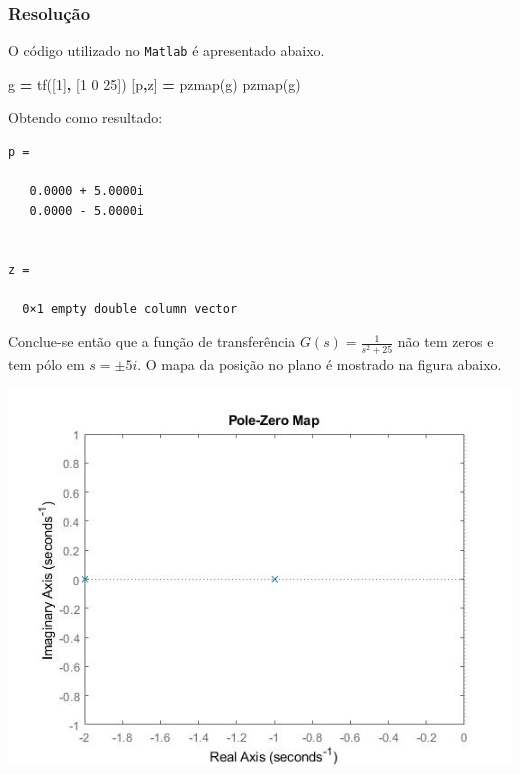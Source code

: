 \documentclass[
]{book}
\newenvironment{Shaded}{\begin{snugshade}}{\end{snugshade}}
\newcommand{\FloatTok}[1]{\textcolor[rgb]{0.00,0.00,0.81}{#1}}
\newcommand{\NormalTok}[1]{#1}
\newcommand{\OperatorTok}[1]{\textcolor[rgb]{0.81,0.36,0.00}{\textbf{#1}}}
\newcommand{\VariableTok}[1]{\textcolor[rgb]{0.00,0.00,0.00}{#1}}
\theoremstyle{definition}
\theoremstyle{definition}
\theoremstyle{definition}
\theoremstyle{remark}
\begin{document}
\hypertarget{resoluuxe7uxe3o-2}{%
\subsubsection*{Resolução}\label{resoluuxe7uxe3o-2}}

O código utilizado no \texttt{Matlab} é apresentado abaixo.

\begin{Shaded}
\begin{Highlighting}[]
\VariableTok{g} \OperatorTok{=} \VariableTok{tf}\NormalTok{([}\FloatTok{1}\NormalTok{]}\OperatorTok{,}\NormalTok{ [}\FloatTok{1} \FloatTok{0} \FloatTok{25}\NormalTok{])}
\NormalTok{[}\VariableTok{p}\OperatorTok{,}\VariableTok{z}\NormalTok{] }\OperatorTok{=} \VariableTok{pzmap}\NormalTok{(}\VariableTok{g}\NormalTok{)}
\VariableTok{pzmap}\NormalTok{(}\VariableTok{g}\NormalTok{)}
\end{Highlighting}
\end{Shaded}

Obtendo como resultado:

\begin{verbatim}
p =

   0.0000 + 5.0000i
   0.0000 - 5.0000i


z =

  0×1 empty double column vector
\end{verbatim}

Conclue-se então que a função de transferência \(G(s) = \frac {1}{s^2 +25}\) não tem zeros e tem pólo em \(s = \pm 5i\). O mapa da posição no plano é mostrado na figura abaixo.

\includegraphics{Imagens/Lab2/prob3.jpg}
\end{document}
